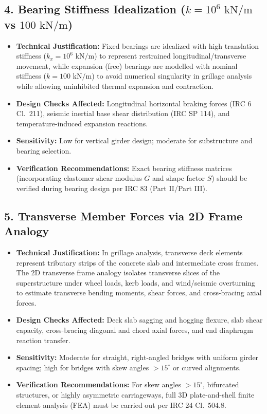 \documentclass[12pt,a4paper]{report}
\numberwithin{table}{chapter}
\numberwithin{figure}{chapter}
\begin{document}
\subsection{4. Bearing Stiffness Idealization ($k = 10^6\text{ kN/m}$ vs $100\text{ kN/m}$)}
\begin{itemize}
    \item \textbf{Technical Justification:} Fixed bearings are idealized with high translation stiffness ($k_x = 10^6\text{ kN/m}$) to represent restrained longitudinal/transverse movement, while expansion (free) bearings are modelled with nominal stiffness ($k = 100\text{ kN/m}$) to avoid numerical singularity in grillage analysis while allowing uninhibited thermal expansion and contraction.
    \item \textbf{Design Checks Affected:} Longitudinal horizontal braking forces (IRC 6 Cl.~211), seismic inertial base shear distribution (IRC SP 114), and temperature-induced expansion reactions.
    \item \textbf{Sensitivity:} Low for vertical girder design; moderate for substructure and bearing selection.
    \item \textbf{Verification Recommendations:} Exact bearing stiffness matrices (incorporating elastomer shear modulus $G$ and shape factor $S$) should be verified during bearing design per IRC 83 (Part II/Part III).
\end{itemize}

\subsection{5. Transverse Member Forces via 2D Frame Analogy}
\begin{itemize}
    \item \textbf{Technical Justification:} In grillage analysis, transverse deck elements represent tributary strips of the concrete slab and intermediate cross frames. The 2D transverse frame analogy isolates transverse slices of the superstructure under wheel loads, kerb loads, and wind/seismic overturning to estimate transverse bending moments, shear forces, and cross-bracing axial forces.
    \item \textbf{Design Checks Affected:} Deck slab sagging and hogging flexure, slab shear capacity, cross-bracing diagonal and chord axial forces, and end diaphragm reaction transfer.
    \item \textbf{Sensitivity:} Moderate for straight, right-angled bridges with uniform girder spacing; high for bridges with skew angles $> 15^\circ$ or curved alignments.
    \item \textbf{Verification Recommendations:} For skew angles $> 15^\circ$, bifurcated structures, or highly asymmetric carriageways, full 3D plate-and-shell finite element analysis (FEA) must be carried out per IRC 24 Cl.~504.8.
\end{itemize}
\end{document}
